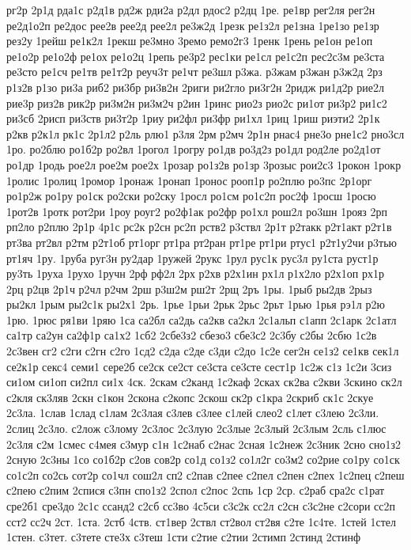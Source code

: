 {рг2р
2р1д
рда1с
р2д1в
рд2ж
рди2а
р2дл
рдос2
р2дц
1ре.
ре1вр
рег2ля
рег2н
ре2д1о2п
ре2дос
рее2в
рее2д
рее2л
ре3ж2д
1резк
ре1з2л
ре1зна
1ре1зо
ре1зр
рез2у
1рейш
ре1к2л
1рекш
ре3мно
3ремо
ремо2г3
1ренк
1рень
ре1он
ре1оп
ре1о2р
ре1о2ф
ре1ох
ре1о2ц
1репь
ре3р2
рес1ки
ре1сл
ре1с2п
рес2с3м
ре3ста
ре3сто
ре1сч
ре1тв
ре1т2р
реуч3т
ре1чт
ре3шл
р3жа.
р3жам
р3жан
р3ж2д
2рз
р1з2в
р1зо
ри3а
риб2
ри3бр
ри3в2н
2риги
ри2гло
ри3г2н
2ридж
ри1д2р
рие2л
рие3р
риз2в
рик2р
ри3м2н
ри3м2ч
р2ин
1ринс
рио2з
рио2с
ри1от
ри3р2
ри1с2
ри3сб
2рисп
ри3ств
ри3т2р
1риу
ри2фл
ри3фр
ри1хл
1риц
1риш
риэти2
2р1к
р2кв
р2к1л
рк1с
2р1л2
р2ль
рлю1
р3ля
2рм
р2мч
2р1н
рнас4
рне3о
рне1с2
рно3сл
1ро.
ро2блю
ро1б2р
ро2вл
1рогол
1рогру
ро1дв
ро3д2з
ро1дл
род2ле
ро2д1от
ро1др
1родь
рое2л
рое2м
рое2х
1розар
ро1з2в
ро1зр
3розыс
рои2с3
1рокон
1рокр
1ролис
1ролиц
1ромор
1ронаж
1ронап
1ронос
рооп1р
ро2плю
ро3пс
2р1орг
ро1р2ж
ро1ру
ро1ск
ро2ски
ро2ску
1росл
ро1см
ро1с2п
рос2ф
1росш
1росю
1рот2в
1ротк
рот2ри
1роу
роуг2
ро2ф1ак
ро2фр
ро1хл
рош2л
ро3шн
1рояз
2рп
рп2ло
р2плю
2р1р
4р1с
рс2к
р2сн
рс2п
рств2
р3ствл
2р1т
р2такк
р2т1акт
р2т1в
рт3ва
рт2вл
р2тм
р2т1об
рт1орг
рт1ра
рт2ран
рт1ре
рт1ри
ртус1
р2т1у2чи
р3тью
рт1яч
1ру.
1руба
руг3н
ру2дар
1ружей
2рукс
1рул
рус1к
рус3л
ру1ста
руст1р
ру3ть
1руха
1рухо
1ручн
2рф
рф2л
2рх
р2хв
р2х1ин
рх1л
р1х2ло
р2х1оп
рх1р
2рц
р2цв
2р1ч
р2чл
р2чм
2рш
р3ш2м
рш2т
2рщ
2ръ
1ры.
1рыб
ры2дв
2рыз
ры2кл
1рым
ры2с1к
ры2х1
2рь.
1рье
1рьи
2рьк
2рьс
2рьт
1рью
1рья
рэ1л
р2ю
1рю.
1рюс
ря1ви
1ряю
1са
са2бл
са2дь
са2кв
са2кл
2с1альп
с1апп
2с1арк
2с1атл
са1тр
са2ун
са2ф1р
са1х2
1сб2
2сбе3з2
сбезо3
сбе3с2
2с3бу
с2бы
2сбю
1с2в
2с3вен
сг2
с2ги
с2гн
с2го
1сд2
с2да
с2де
с3ди
с2до
1с2е
сег2н
се1з2
се1кв
сек1л
се2к1р
секс4
семи1
сере2б
се2ск
се2ст
се3ста
се3сте
сест1р
1с2ж
с1з
1с2и
3сиз
си1ом
си1оп
си2пл
си1х
4ск.
2скам
с2канд
1с2каф
2сках
ск2ва
с2кви
3скино
ск2л
с2кля
ск3ляв
2скн
с1кон
2скона
с2копс
2скош
ск2р
с1кра
2скриб
ск1с
2скуе
2с3ла.
1слав
1слад
с1лам
2с3лая
с3лев
с3лее
с1лей
слео2
с1лет
с3лею
2с3ли.
2слиц
2с3ло.
с2лож
с3лому
2с3лос
2с3лую
2с3лые
2с3лый
2с3лым
2сль
с1люс
2с3ля
с2м
1смес
с4мея
с3мур
с1н
1с2наб
с2нас
2сная
1с2неж
2с3ник
2сно
сно1з2
2сную
2с3ны
1со
со1б2р
с2ов
сов2р
со1д
со1з2
со1л2г
со3м2
со2рие
со1ру
со1ск
со1с2п
со2сь
сот2р
со1чл
сош2л
сп2
с2пав
с2пее
с2пел
с2пен
с2пех
1с2пец
с2пеш
с2пею
с2пим
2спися
с3пн
спо1з2
2спол
с2пос
2спь
1ср
2ср.
с2раб
сра2с
с1рат
сре2б1
сре3до
2с1с
ссанд2
с2сб
сс3во
4с5си
с3с2к
сс2л
с2сн
с3с2не
с2сори
сс2п
сст2
сс2ч
2ст.
1ста.
2стб
4ств.
ст1вер
2ствл
ст2вол
ст2вя
с2те
1с4те.
1стей
1стел
1стен.
с3тет.
с3тете
сте3х
с3теш
1сти
с2тие
с2тии
2стимп
2стинд
2стинф
}
